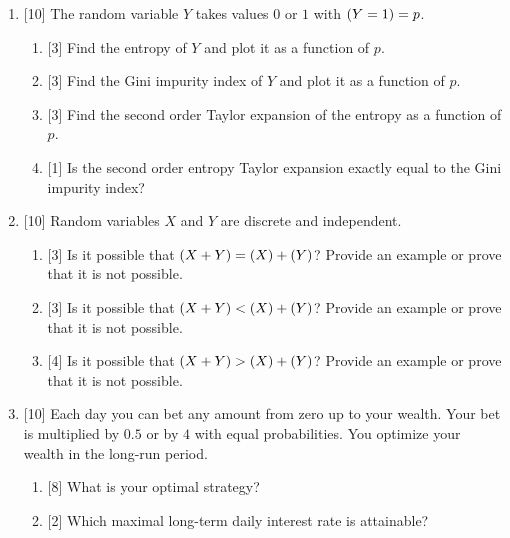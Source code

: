 \documentclass[12pt]{article}
\let\P\relax
\DeclareMathOperator{\P}{\mathbb{P}}
\let\H\relax
\DeclareMathOperator{\H}{\mathbb{H}}
\begin{document}

\begin{enumerate}

\item {[10]} The random variable $Y$ takes values $0$ or $1$ with $\P(Y = 1) = p$.
\begin{enumerate}
    \item {[3]} Find the entropy of $Y$ and plot it as a function of $p$.
    \item {[3]} Find the Gini impurity index of $Y$ and plot it as a function of $p$.
    \item {[3]} Find the second order Taylor expansion of the entropy as a function of $p$.
    \item {[1]} Is the second order entropy Taylor expansion exactly equal to the Gini impurity index?
\end{enumerate}
    

\item {[10]} Random variables $X$ and $Y$ are discrete and independent.

\begin{enumerate}
    \item {[3]} Is it possible that $\H(X + Y) = \H(X) + \H(Y)$? 
    Provide an example or prove that it is not possible. 
    \item {[3]} Is it possible that $\H(X + Y) < \H(X) + \H(Y)$? 
    Provide an example or prove that it is not possible. 
    \item {[4]} Is it possible that $\H(X + Y) > \H(X) + \H(Y)$? 
    Provide an example or prove that it is not possible. 
\end{enumerate}

\item {[10]} Each day you can bet any amount from zero up to your wealth.
Your bet is multiplied by $0.5$ or by $4$ with equal probabilities. 
You optimize your wealth in the long-run period. 

\begin{enumerate}
    \item {[8]} What is your optimal strategy?
    \item {[2]} Which maximal long-term daily interest rate is attainable?
\end{enumerate}



\end{enumerate}
\end{document}
